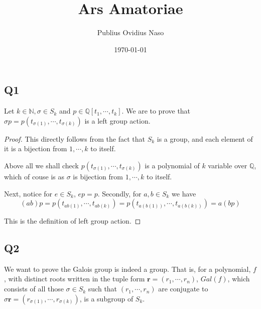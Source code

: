 \documentclass{article}
\title{Ars Amatoriae}
\author{Publius Ovidius Naso}
\date{\today}
\theoremstyle{definition}
\theoremstyle{definition}
\theoremstyle{remark}
\newcommand{\bb}[1]{\mathbb{#1}} %
\begin{document}

\subsection*{Q1}
Let $k\in \bb{N}, \sigma \in S_k$ and $p \in \bb{Q}[t_1, \cdots, t_k]$. We are to prove that $\sigma p = p(t_{\sigma(1)}, \cdots, t_{\sigma(k)})$ is a left group action. 

\begin{proof}
	This directly follows from the fact that $S_k$ is a group, and each element of it is a bijection from $1, \cdots, k$ to itself.

	Above all we shall check $p(t_{\sigma(1)}, \cdots, t_{\sigma(k)})$ is a polynomial of $k$ variable over $\bb{Q}$, which of couse is as $\sigma$ is bijection from $1, \cdots,k$ to itself.

	Next, notice for $e \in S_k$, $e p = p$. Secondly, for $a,b \in S_k$ we have 
	\begin{equation}
		(ab) p
		= p(t_{ab(1)}, \cdots, t_{ab(k)}) 
		=p(t_{a(b(1))}, \cdots, t_{a(b(k))})
		=a(b p)
	\end{equation}	

	This is the definition of left group action.
\end{proof}

\subsection*{Q2}
We want to prove the Galois group is indeed a group. That is, for a polynomial, $f$, with distinct roots written in the tuple form $\bm{r} = (r_1, \cdots, r_n)$, $Gal(f)$, which consists of all those $\sigma \in S_k$ such that $(r_1, \cdots, r_n)$ are conjugate to $\sigma \bm{r} = ( r_{\sigma(1)}, \cdots,  r_{\sigma{(k)}})$, is a subgroup of $S_k$.
\end{document}
